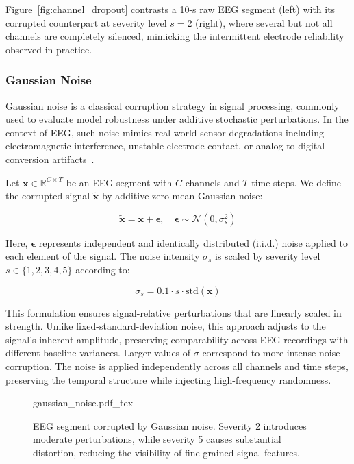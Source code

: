 Figure~\ref{fig:channel_dropout} contrasts a 10-s raw EEG segment (left) with its corrupted counterpart at severity level \(s{=}2\) (right), where several but not all channels are completely silenced, mimicking the intermittent electrode reliability observed in practice.

\subsubsection{Gaussian Noise}
Gaussian noise is a classical corruption strategy in signal processing, commonly used to evaluate model robustness under additive stochastic perturbations. In the context of EEG, such noise mimics real-world sensor degradations including electromagnetic interference, unstable electrode contact, or analog-to-digital conversion artifacts~\cite{gaussian}.

Let \( \mathbf{x} \in \mathbb{R}^{C \times T} \) be an EEG segment with \( C \) channels and \( T \) time steps. We define the corrupted signal \( \tilde{\mathbf{x}} \) by additive zero-mean Gaussian noise:

\begin{equation}
\tilde{\mathbf{x}} = \mathbf{x} + \boldsymbol{\epsilon}, \quad \boldsymbol{\epsilon} \sim \mathcal{N}(0, \sigma_s^2)
\end{equation}

Here, \( \boldsymbol{\epsilon} \) represents independent and identically distributed (i.i.d.) noise applied to each element of the signal. The noise intensity \( \sigma_s \) is scaled by severity level \( s \in \{1,2,3,4,5\} \) according to:

\begin{equation}
\sigma_s = 0.1 \cdot s \cdot \mathrm{std}(\mathbf{x})
\end{equation}

This formulation ensures signal-relative perturbations that are linearly scaled in strength. Unlike fixed-standard-deviation noise, this approach adjusts to the signal's inherent amplitude, preserving comparability across EEG recordings with different baseline variances. Larger values of \( \sigma \) correspond to more intense noise corruption. The noise is applied independently across all channels and time steps, preserving the temporal structure while injecting high-frequency randomness.

\begin{figure}[htb]
	\centering
    \def\svgwidth{400pt}
 	{gaussian_noise.pdf_tex} 	 	
	\caption[Gaussian Noise corruption applied to a 10-second EEG segment]{EEG segment corrupted by Gaussian noise. Severity 2 introduces moderate perturbations, while severity 5 causes substantial distortion, reducing the visibility of fine-grained signal features.}
	\label{fig:gaussian}
\end{figure}

